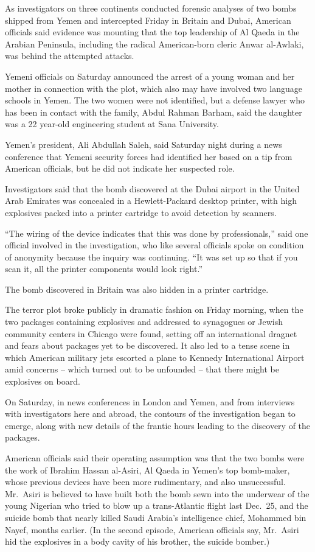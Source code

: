 ﻿\documentclass[12pt]{article}
\begin{document}
As investigators on three continents conducted forensic analyses of two bombs shipped from Yemen and
intercepted Friday in Britain and Dubai, American officials said evidence was mounting that the top
leadership of Al Qaeda in the Arabian Peninsula, including the radical American-born cleric Anwar
al-Awlaki, was behind the attempted attacks.

Yemeni officials on Saturday announced the arrest of a young woman and her mother in connection with
the plot, which also may have involved two language schools in Yemen. The two women were not
identified, but a defense lawyer who has been in contact with the family, Abdul Rahman Barham, said
the daughter was a 22 year-old engineering student at Sana University.

Yemen's president, Ali Abdullah Saleh, said Saturday night during a news conference that Yemeni
security forces had identified her based on a tip from American officials, but he did not indicate
her suspected role.

Investigators said that the bomb discovered at the Dubai airport in the United Arab Emirates was
concealed in a Hewlett-Packard desktop printer, with high explosives packed into a printer cartridge
to avoid detection by scanners.

``The wiring of the device indicates that this was done by professionals,'' said one official
involved in the investigation, who like several officials spoke on condition of anonymity because
the inquiry was continuing. ``It was set up so that if you scan it, all the printer components would
look right.''

The bomb discovered in Britain was also hidden in a printer cartridge.

The terror plot broke publicly in dramatic fashion on Friday morning, when the two packages
containing explosives and addressed to synagogues or Jewish community centers in Chicago were found,
setting off an international dragnet and fears about packages yet to be discovered. It also led to a
tense scene in which American military jets escorted a plane to Kennedy International Airport amid
concerns -- which turned out to be unfounded -- that there might be explosives on board.

On Saturday, in news conferences in London and Yemen, and from interviews with investigators here
and abroad, the contours of the investigation began to emerge, along with new details of the frantic
hours leading to the discovery of the packages.

American officials said their operating assumption was that the two bombs were the work of Ibrahim
Hassan al-Asiri, Al Qaeda in Yemen's top bomb-maker, whose previous devices have been more
rudimentary, and also unsuccessful. Mr.~Asiri is believed to have built both the bomb sewn into the
underwear of the young Nigerian who tried to blow up a trans-Atlantic flight last Dec.~25, and the
suicide bomb that nearly killed Saudi Arabia's intelligence chief, Mohammed bin Nayef, months
earlier. (In the second episode, American officials say, Mr.~Asiri hid the explosives in a body
cavity of his brother, the suicide bomber.)
\end{document}
